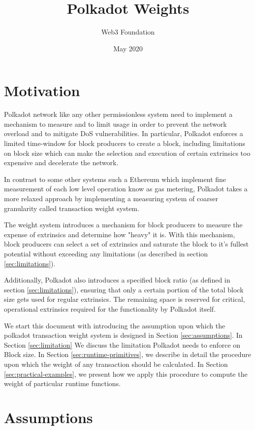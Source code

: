 \documentclass[11pt,a4paper]{article}
\begin{document}
\title{Polkadot Weights}
\author{Web3 Foundation}
\date{May 2020}
\maketitle

\section{Motivation}
Polkadot network like any other permissionless system need to implement a mechanism to measure and to limit usage in order to prevent the network overload and to mitigate DoS vulnerabilities. In particular, Polkadot enforces a limited time-window for block producers to create a block, including limitations on block size which can make the selection and execution
of certain extrinsics too expensive and decelerate the network.

In contrast to some other systems such a Ethereum which implement fine measurement of each low level operation know as gas metering, Polkadot takes a more relaxed approach by implementing a measuring system of coarser granularity called transaction weight system.

The weight
system introduces a mechanism for block producers to measure the expense of
extrinsics and determine how "heavy" it is. With this mechanism, block producers
can select a set of extrinsics and saturate the block to it's fullest potential
without exceeding any limitations (as described in section \ref{sec:limitations}).
\newline

Additionally, Polkadot also introduces a specified block ratio (as defined in section \ref{sec:limitations}),
ensuring that only a certain portion of the total block size gets used for regular extrinsics.
The remaining space is reserved for critical, operational extrinsics required for the functionality
by Polkadot itself.

We start this document with introducing the assumption upon which the polkadot transaction weight system is designed in Section \ref{sec:assumptions}. In Section \ref{sec:limitation} We discuss the limitation Polkadot needs to enforce on Block size. In Section \ref{sec:runtime-primitives}, we describe in detail the procedure upon which the weight of any transaction should be calculated. In Section \ref{sec:practical-examples}, we present how we apply this procedure to compute the weight of particular runtime functions.

\section{Assumptions}\label{sec:assumption}
\end{document}
